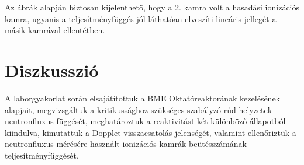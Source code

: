 \documentclass[12pt,a4paper]{article}
\begin{document}
\newline
Az ábrák alapján biztosan kijelenthető, hogy a 2. kamra volt a hasadási ionizációs kamra, ugyanis a teljesítményfüggés jól láthatóan elveszíti lineáris jellegét a másik kamrával ellentétben.\\

\section{Diszkusszió}
\hspace*{10pt} A laborgyakorlat során elsajátítottuk a BME Oktatóreaktorának kezelésének alapjait, megvizsgáltuk a kritikussághoz szükséges szabályzó rúd helyzetek neutronfluxus-függését, meghatároztuk a reaktivitást két különböző állapotból kiindulva, kimutattuk a Dopplet-visszacsatolás jelenségét, valamint ellenőriztük a neutronfluxus mérésére használt ionizációs kamrák beütésszámának teljesítményfüggését.
\end{document}
